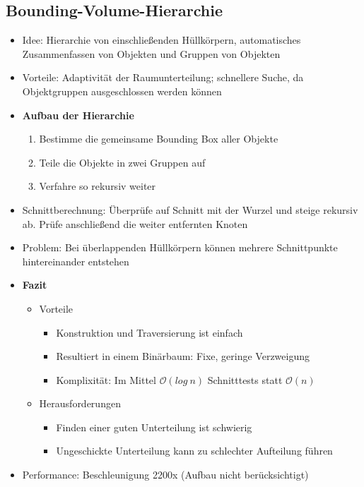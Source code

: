 \subsection{Bounding-Volume-Hierarchie}
\begin{itemize}
	\item Idee: Hierarchie von einschließenden Hüllkörpern, automatisches Zusammenfassen von Objekten und Gruppen von Objekten
	\item Vorteile: Adaptivität der Raumunterteilung; schnellere Suche, da Objektgruppen ausgeschlossen werden können
	\item \textbf{Aufbau der Hierarchie}
	\begin{enumerate}
		\item Bestimme die gemeinsame Bounding Box aller Objekte
		\item Teile die Objekte in zwei Gruppen auf
		\item Verfahre so rekursiv weiter
	\end{enumerate}
	\item Schnittberechnung: Überprüfe auf Schnitt mit der Wurzel und steige rekursiv ab. Prüfe anschließend die weiter entfernten Knoten
	\item Problem: Bei überlappenden Hüllkörpern können mehrere Schnittpunkte hintereinander entstehen
	\item \textbf{Fazit}
	\begin{itemize}
		\item Vorteile
		\begin{itemize}
			\item Konstruktion und Traversierung ist einfach
			\item Resultiert in einem Binärbaum: Fixe, geringe Verzweigung
			\item Komplixität: Im Mittel \(\mathcal{O}(log~n)\) Schnitttests statt \(\mathcal{O}(n)\)
		\end{itemize}
		\item Herausforderungen
		\begin{itemize}
			\item Finden einer guten Unterteilung ist schwierig
			\item Ungeschickte Unterteilung kann zu schlechter Aufteilung führen
		\end{itemize}
	\end{itemize}
	\item Performance: Beschleunigung 2200x (Aufbau nicht berücksichtigt)
\end{itemize}


